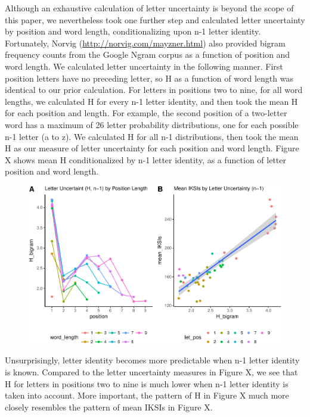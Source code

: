\documentclass[floatsintext,man]{apa6}
\theoremstyle{definition}
\theoremstyle{definition}
\theoremstyle{definition}
\theoremstyle{remark}
\begin{document}
Although an exhaustive calculation of letter uncertainty is beyond the
scope of this paper, we nevertheless took one further step and
calculated letter uncertainty by position and word length,
conditionalizing upon n-1 letter identity. Fortunately, Norvig
(\url{http://norvig.com/mayzner.html}) also provided bigram frequency
counts from the Google Ngram corpus as a function of position and word
length. We calculated letter uncertainty in the following manner. First
position letters have no preceding letter, so H as a function of word
length was identical to our prior calculation. For letters in positions
two to nine, for all word lengths, we calculated H for every n-1 letter
identity, and then took the mean H for each position and length. For
example, the second position of a two-letter word has a maximum of 26
letter probability distributions, one for each possible n-1 letter (a to
z). We calculated H for all n-1 distributions, then took the mean H as
our measure of letter uncertainty for each position and word length.
Figure X shows mean H conditionalized by n-1 letter identity, as a
function of letter position and word length.

\begin{figure}[htbp]
\centering
\includegraphics{Entropy_typing_draft_files/figure-latex/letter_uncertainty_bigram-1.pdf}
\caption{}
\end{figure}

Unsurprisingly, letter identity becomes more predictable when n-1 letter
identity is known. Compared to the letter uncertainty measures in Figure
X, we see that H for letters in positions two to nine is much lower when
n-1 letter identity is taken into account. More important, the pattern
of H in Figure X much more closely resembles the pattern of mean IKSIs
in Figure X.
\end{document}
